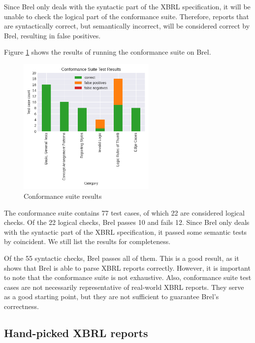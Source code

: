 Since Brel only deals with the syntactic part of the XBRL specification, 
it will be unable to check the logical part of the conformance suite.
Therefore, reports that are syntactically correct, but semantically incorrect, will be considered correct by Brel,
resulting in false positives.

Figure \ref{fig:conformance_suite} shows the results of running the conformance suite on Brel.

\begin{figure}[H]
  \centering
  \includegraphics[width=0.6\textwidth]{images/seattle_method_test_results.png}
    \caption{Conformance suite results}
    \label{fig:conformance_suite}
\end{figure}

The conformance suite contains 77 test cases, of which 22 are considered logical checks.
Of the 22 logical checks, Brel passes 10 and fails 12.
Since Brel only deals with the syntactic part of the XBRL specification,
it passed some semantic tests by coincident.
We still list the results for completeness.

Of the 55 syntactic checks, Brel passes all of them.
This is a good result, as it shows that Brel is able to parse XBRL reports correctly.
However, it is important to note that the conformance suite is not exhaustive.
Also, conformance suite test cases are not necessarily representative of real-world XBRL reports.
They serve as a good starting point, but they are not sufficient to guarantee Brel's correctness.

\subsection{Hand-picked XBRL reports}

